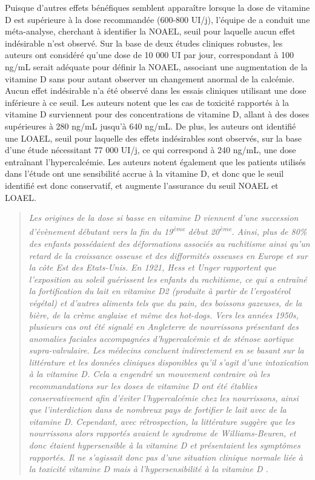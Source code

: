 \documentclass[
  a4paper,
  DIV=11,
  numbers=noendperiod,
  listof=totoc]{scrreprt}
\begin{document}
Puisque d'autres effets bénéfiques semblent apparaître lorsque la dose
de vitamine D est supérieure à la dose recommandée (600-800 UI/j),
l'équipe de \textcite{Hathcock.2007} a conduit une méta-analyse,
cherchant à identifier la \ac{NOAEL}, seuil pour laquelle aucun effet
indésirable n'est observé. Sur la base de deux études cliniques
robustes, les auteurs ont considéré qu'une dose de 10 000 UI par jour,
correspondant à 100 ng/mL serait adéquate pour définir la \ac{NOAEL},
associant une augmentation de la vitamine D sans pour autant observer un
changement anormal de la calcémie. Aucun effet indésirable n'a été
observé dans les essais cliniques utilisant une dose inférieure à ce
seuil. Les auteurs notent que les cas de toxicité rapportés à la
vitamine D surviennent pour des concentrations de vitamine D, allant à
des doses supérieures à 280 ng/mL jusqu'à 640 ng/mL. De plus, les
auteurs ont identifié une \ac{LOAEL}, seuil pour laquelle des effets
indésirables sont observés, sur la base d'une étude nécessitant 77 000
UI/j, ce qui correspond à 240 ng/mL, une dose entraînant
l'hypercalcémie. Les auteurs notent également que les patients utilisés
dans l'étude ont une sensibilité accrue à la vitamine D, et donc que le
seuil identifié est donc conservatif, et augmente l'assurance du seuil
NOAEL et LOAEL.

\begin{quote}
\emph{Les origines de la dose si basse en vitamine D viennent d'une
succession d'évènement débutant vers la fin du 19\textsuperscript{ème}
début 20\textsuperscript{ème}. Ainsi, plus de 80\% des enfants
possédaient des déformations associés au rachitisme ainsi qu'un retard
de la croissance osseuse et des difformités osseuses en Europe et sur la
côte Est des Etats-Unis. En 1921, Hess et Unger rapportent que
l'exposition au soleil guérissent les enfants du rachitisme, ce qui a
entraîné la fortification du lait en vitamine D2 (produite à partir de
l'ergostérol végétal) et d'autres aliments tels que du pain, des
boissons gazeuses, de la bière, de la crème anglaise et même des
hot-dogs. Vers les années 1950s, plusieurs cas ont été signalé en
Angleterre de nourrissons présentant des anomalies faciales accompagnées
d'hypercalcémie et de sténose aortique supra-valvulaire. Les médecins
concluent indirectement en se basant sur la littérature et les données
cliniques disponibles qu'il s'agit d'une intoxication à la vitamine D.
Cela a engendré un mouvement contraire où les recommandations sur les
doses de vitamine D ont été établies conservativement afin d'éviter
l'hypercalcémie chez les nourrissons, ainsi que l'interdiction dans de
nombreux pays de fortifier le lait avec de la vitamine D. Cependant,
avec rétrospection, la littérature suggère que les nourrissons alors
rapportés avaient le syndrome de Williams-Beuren, et donc étaient
hypersensible à la vitamine D et présentaient les symptômes rapportés.
Il ne s'agissait donc pas d'une situation clinique normale liée à la
toxicité vitamine D mais à l'hypersensibilité à la vitamine D
\autocite{Holick.2015}.}
\end{quote}
\end{document}
